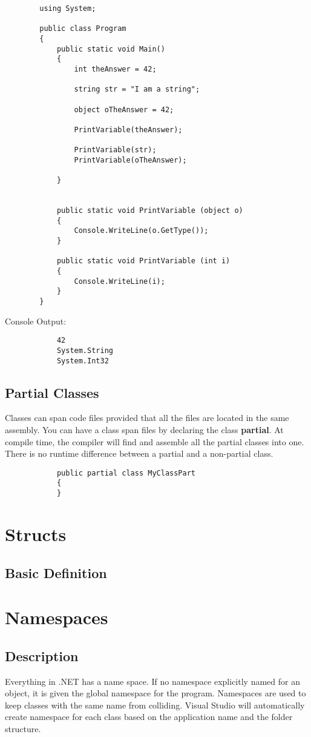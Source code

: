 \documentclass {amsart}
\begin{document}
		\begin{lstlisting}
		using System;
							
		public class Program
		{
			public static void Main()
			{
				int theAnswer = 42;

				string str = "I am a string";

				object oTheAnswer = 42;		

				PrintVariable(theAnswer);
				
				PrintVariable(str);
				PrintVariable(oTheAnswer);
				
			}
			
			
			public static void PrintVariable (object o)
			{
				Console.WriteLine(o.GetType());	
			}
			
			public static void PrintVariable (int i)
			{
				Console.WriteLine(i);	
			}	
		}
		\end{lstlisting}
		Console Output: 
		\begin{verbatim}
			42
			System.String
			System.Int32
		\end{verbatim}

	\subsection{Partial Classes}  Classes can span code files provided that all the files are located in the same assembly.  You can have a class span files by declaring the class {\bf partial}.  At compile time, the compiler will find and assemble all the partial classes into one.  There is no runtime difference between a partial and a non-partial class. 
		\begin{lstlisting}
			public partial class MyClassPart
			{
			}
		\end{lstlisting}
\section{Structs}
	\subsection{Basic Definition}
	

\section{Namespaces}
	\subsection{Description} Everything in .NET has a name space.  If no namespace explicitly named for an object, it is given the global namespace for the program.  Namespaces are used to keep classes with the same name from colliding.  Visual Studio will automatically create namespace for each class based on the application name and the folder structure. 
\end{document}
